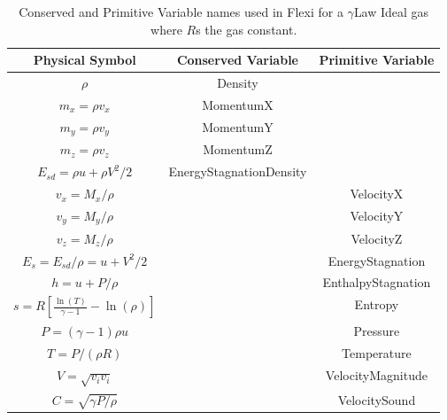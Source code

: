 \begin{table}[h!]
 \begin{center}
  \caption{Conserved and Primitive Variable names used in Flexi for a \texorpdfstring{$\gamma$}-Law Ideal gas where \texorpdfstring{$R$} is the gas constant.}
  \label{tab:flexiVars}
  \begin{tabular}{|c|c|c|} \hline
  \textbf{Physical Symbol} & \parbox{0.3\linewidth}{\centering \textbf{Conserved Variable}} & \parbox{0.3\linewidth}{\centering \textbf{Primitive Variable}} \\ \hline
   $\rho$                                             & Density                              & \\
   $m_x = \rho v_x$                            & MomentumX                      & \\
   $m_y = \rho v_y$                            & MomentumY                      & \\
   $m_z = \rho v_z$                             & MomentumZ                     & \\
   $E_{sd} = \rho u + \rho V^2/2$     & EnergyStagnationDensity & \\
   $v_x = M_x / \rho$                           &                                          & VelocityX \\
   $v_y = M_y / \rho$                           &                                          & VelocityY \\
   $v_z = M_z / \rho$                           &                                          & VelocityZ \\
   $E_s = E_{sd}/\rho = u + V^2/2 $ &                                           & EnergyStagnation \\
   $h = u + P/\rho$                             &                                           & EnthalpyStagnation \\
   $s = R \left[ \frac{\ln(T)}{\gamma-1} - \ln(\rho) \right]$ &         & Entropy \\
   $P = (\gamma - 1) \rho u$              &                                           & Pressure \\
   $T = P/(\rho R) $                             &                                           & Temperature \\
   $V = \sqrt{v_i v_i}$                        &                                           & VelocityMagnitude \\
   $C = \sqrt{\gamma P/\rho}$          &                                           & VelocitySound \\

\end{tabular}
\end{center}
\end{table}
